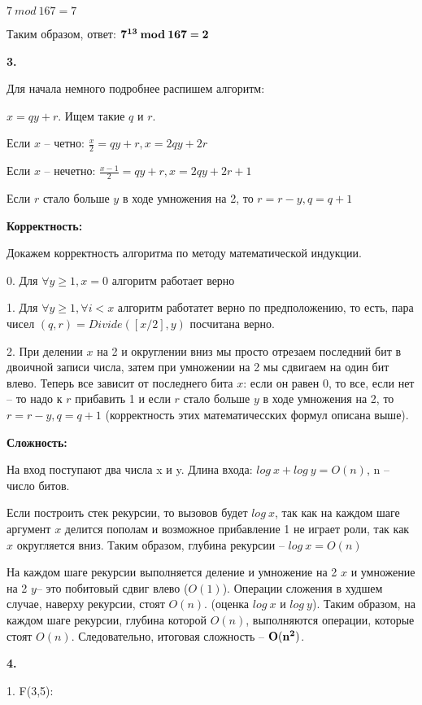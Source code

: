 \documentclass[12pt]{extreport}
\begin{document}
$7 \:mod \:167 = 7$

Таким образом, ответ: ${\bf 7^{13} \:mod \:167 = 2}$


\bigskip
{\bf 3.}  

Для начала немного подробнее распишем алгоритм: 

$x = qy+r$. Ищем такие $q$ и $r$.

Если $x$ -- четно: $\frac{x}{2} = qy + r, x = 2qy + 2r$

Если $x$ -- нечетно: $\frac{x-1}{2} = qy + r, x = 2qy + 2r+1$

Если $r$ стало больше $y$ в ходе умножения на 2, то $r=r-y, q=q+1$

\bigskip

{\bf Корректность:}

Докажем корректность алгоритма по методу математической индукции. 

0. Для $\forall y \geq 1 , x = 0$ алгоритм работает верно

1. Для $\forall y \geq 1, \forall i < x $ алгоритм работатет верно по предположению, то есть, пара чисел $(q,r) = Divide([x/2],y)$ посчитана верно. 

2. При делении $x$ на 2 и округлении вниз мы просто отрезаем последний бит в двоичной записи числа, затем при умножении на 2 мы сдвигаем на один бит влево. Теперь все зависит от последнего бита $x$: если он равен 0, то все, если нет -- то надо к $r$ прибавить 1 и если $r$ стало больше $y$ в ходе умножения на 2, то $r=r-y, q=q+1$ (корректность этих математичесских формул описана выше). 

\bigskip
{\bf Сложность:}

На вход поступают два числа x и y. Длина входа: $log \:x + log\: y = O(n)$, n -- число битов. 

Если построить стек рекурсии, то вызовов будет $log \:x$, так как на каждом шаге аргумент $x$ делится пополам и возможное прибавление 1 не играет роли, так как $x$ округляется вниз. Таким образом, глубина рекурсии -- $log \:x = O(n)$

На каждом шаге рекурсии выполняется деление и умножение на 2 $x$ и умножение на 2 $y$-- это побитовый сдвиг влево ($O(1)$). Операции сложения в худшем случае, наверху рекурсии, стоят $O(n)$. (оценка $log \:x$ и $log \:y$). Таким образом, на каждом шаге рекурсии, глубина которой $O(n)$, выполняются операции, которые стоят $O(n)$. Следовательно, итоговая сложность -- ${\bf O(n^2)}$.

\bigskip
{\bf 4.}  

1. F(3,5):
\end{document}
